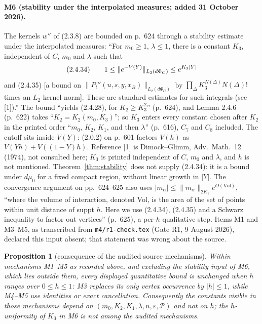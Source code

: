 \documentclass[11pt,a4paper]{article}
\theoremstyle{plain}
\newtheorem{proposition}[theorem]{Proposition}
\theoremstyle{definition}
\theoremstyle{plain}
\theoremstyle{definition}
\begin{document}
\paragraph{M6 (stability under the interpolated measures; added 31 October 2026).}
The kernels $w''$ of (2.3.8) are bounded on p.~624 through a stability estimate under the
interpolated measures: ``For $m_0\ge1$, $\lambda\le1$, there is a constant $K_3$,
independent of $C$, $m_0$ and $\lambda$ such that
\[
 \textup{(2.4.34)}\qquad 1\le\|e^{-V(Y)}\|_{L_2(d\Phi_C)}\le e^{K_3|Y|}
\]
and (2.4.35) [a bound on $\|P_l''(u,s,y,x_B)\|_{L_2(d\Phi_C)}$ by
$\prod_\Delta K_3^{N(\Delta)}N(\Delta)!$ times an $L_2$ kernel norm]. These are standard
estimates for such integrals (see [1]).'' The bound ``yields (2.4.28), for $K_2\ge K_3^2$''
(p.~624), and Lemma 2.4.6 (p.~622) takes ``$K_2=K_2(m_0,K_3)$''; so $K_3$ enters every
constant chosen after $K_2$ in the printed order ``$m_0$, $K_2$, $K_1$, and then $\lambda$'' (p.~616), $C_7$ and
$C_8$ included.  The cutoff sits inside $V(Y)$: (2.0.2) on p.~601 factors $V(h)$ as
$V(Yh)+V((1-Y)h)$.  Reference [1] is Dimock--Glimm, Adv.\ Math.\ 12 (1974), not consulted
here; $K_3$ is printed independent of $C$, $m_0$ and $\lambda$, and $h$ is not mentioned.
Theorem~\ref{thm:stability} does not supply (2.4.34): it is a bound under $d\mu_0$ for a
fixed compact region, without linear growth in $|Y|$.  The convergence argument on
pp.~624--625 also uses $|m_\alpha|\le\|m_\alpha\|_{2K_2}e^{O(\mathrm{Vol})}$, ``where the
volume of interaction, denoted Vol, is the area of the set of points within unit distance
of suppt $h$. Here we use (2.4.34), (2.4.35) and a Schwarz inequality to factor out
vertices'' (p.~625), a per-$h$ qualitative step.  Items
M1 and M3--M5, as transcribed from \texttt{m4/r1-check.tex} (Gate R1, 9 August 2026),
declared this input absent; that statement was wrong about the source.

\begin{proposition}[consequence of the audited source mechanisms]\label{prop:struct}
Within mechanisms M1--M5 as recorded above, and excluding the stability input of M6,
which lies outside them, every displayed quantitative bound is unchanged when $h$ ranges
over $0\le h\le1$: M3 replaces its only vertex occurrence by $|h|\le1$, while M4--M5 use
identities or exact cancellation.  Consequently the constants visible in those mechanisms
depend on $(m_0,K_2,K_1,\lambda,n,\varepsilon,\mathscr P)$ and not on $h$; the
$h$-uniformity of $K_3$ in M6 is not among the audited mechanisms.
\end{proposition}
\end{document}
